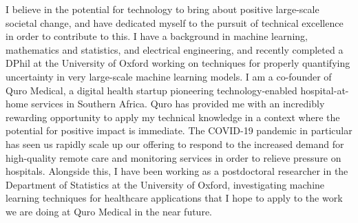 \documentclass[9pt]{developercv} %
\begin{document}
\vspace{.5cm}



\begin{minipage}[t]{\textwidth} %
    \vspace{-\baselineskip} %
    {I believe in the potential for technology to bring about positive large-scale societal change, and have dedicated myself to the pursuit of technical excellence in order to contribute to this.
    I have a background in machine learning, mathematics and statistics, and electrical engineering, and recently completed a DPhil at the University of Oxford working on techniques for properly quantifying uncertainty in very large-scale machine learning models.
    I am a co-founder of Quro Medical, a digital health startup pioneering technology-enabled hospital-at-home services in Southern Africa.
    Quro has provided me with an incredibly rewarding opportunity to apply my technical knowledge in a context where the potential for positive impact is immediate.
    The COVID-19 pandemic in particular has seen us rapidly scale up our offering to respond to the increased demand for high-quality remote care and monitoring services in order to relieve pressure on hospitals.
    Alongside this, I have been working as a postdoctoral researcher in the Department of Statistics at the University of Oxford, investigating machine learning techniques for healthcare applications that I hope to apply to the work we are doing at Quro Medical in the near future.}


\end{minipage}
\end{document}
